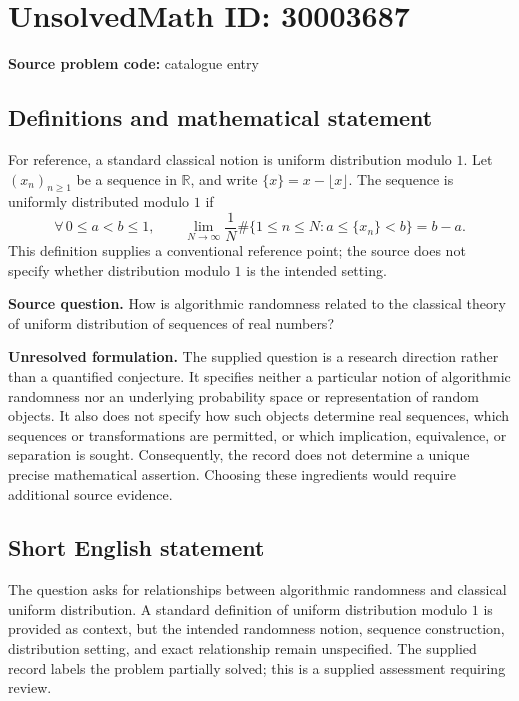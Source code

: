 \documentclass[11pt]{article}
\newcommand{\R}{\mathbb{R}}
\begin{document}
\section*{UnsolvedMath ID: 30003687}
\textbf{Source problem code:} catalogue entry
\subsection{Definitions and mathematical statement}
For reference, a standard classical notion is uniform distribution modulo \(1\). Let \((x_n)_{n\geq 1}\) be a sequence in \(\R\), and write \(\{x\}=x-\lfloor x\rfloor\). The sequence is uniformly distributed modulo \(1\) if
\[
\forall\,0\leq a<b\leq 1,\qquad
\lim_{N\to\infty}\frac{1}{N}\#\bigl\{1\leq n\leq N:a\leq\{x_n\}<b\bigr\}=b-a.
\]
This definition supplies a conventional reference point; the source does not specify whether distribution modulo \(1\) is the intended setting.

\textbf{Source question.} How is algorithmic randomness related to the classical theory of uniform distribution of sequences of real numbers?

\textbf{Unresolved formulation.} The supplied question is a research direction rather than a quantified conjecture. It specifies neither a particular notion of algorithmic randomness nor an underlying probability space or representation of random objects. It also does not specify how such objects determine real sequences, which sequences or transformations are permitted, or which implication, equivalence, or separation is sought. Consequently, the record does not determine a unique precise mathematical assertion. Choosing these ingredients would require additional source evidence.
\subsection{Short English statement}
The question asks for relationships between algorithmic randomness and classical uniform distribution. A standard definition of uniform distribution modulo \(1\) is provided as context, but the intended randomness notion, sequence construction, distribution setting, and exact relationship remain unspecified. The supplied record labels the problem partially solved; this is a supplied assessment requiring review.
\end{document}
